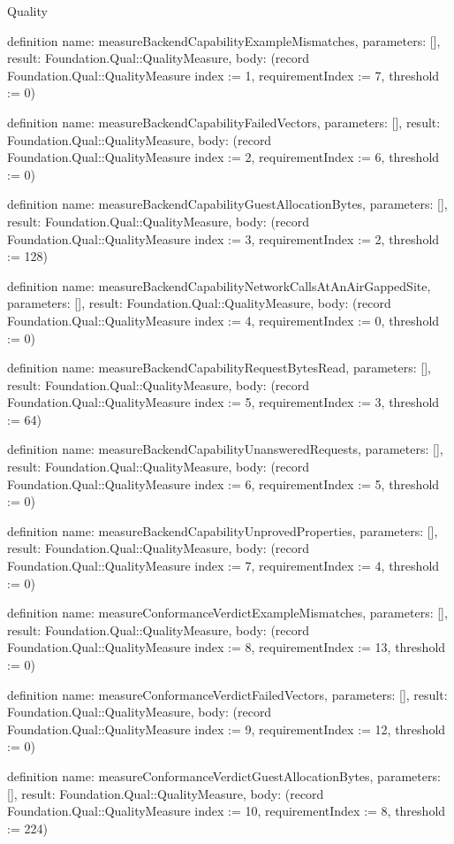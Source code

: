 \begin{lexlean}{Quality}
\begin{semanticmodule}
definition{
  name: measureBackendCapabilityExampleMismatches,
  parameters: [],
  result: Foundation.Qual::QualityMeasure,
  body: (record Foundation.Qual::QualityMeasure {index := 1, requirementIndex := 7, threshold := 0})
}

definition{
  name: measureBackendCapabilityFailedVectors,
  parameters: [],
  result: Foundation.Qual::QualityMeasure,
  body: (record Foundation.Qual::QualityMeasure {index := 2, requirementIndex := 6, threshold := 0})
}

definition{
  name: measureBackendCapabilityGuestAllocationBytes,
  parameters: [],
  result: Foundation.Qual::QualityMeasure,
  body: (record Foundation.Qual::QualityMeasure {index := 3, requirementIndex := 2, threshold := 128})
}

definition{
  name: measureBackendCapabilityNetworkCallsAtAnAirGappedSite,
  parameters: [],
  result: Foundation.Qual::QualityMeasure,
  body: (record Foundation.Qual::QualityMeasure {index := 4, requirementIndex := 0, threshold := 0})
}

definition{
  name: measureBackendCapabilityRequestBytesRead,
  parameters: [],
  result: Foundation.Qual::QualityMeasure,
  body: (record Foundation.Qual::QualityMeasure {index := 5, requirementIndex := 3, threshold := 64})
}

definition{
  name: measureBackendCapabilityUnansweredRequests,
  parameters: [],
  result: Foundation.Qual::QualityMeasure,
  body: (record Foundation.Qual::QualityMeasure {index := 6, requirementIndex := 5, threshold := 0})
}

definition{
  name: measureBackendCapabilityUnprovedProperties,
  parameters: [],
  result: Foundation.Qual::QualityMeasure,
  body: (record Foundation.Qual::QualityMeasure {index := 7, requirementIndex := 4, threshold := 0})
}

definition{
  name: measureConformanceVerdictExampleMismatches,
  parameters: [],
  result: Foundation.Qual::QualityMeasure,
  body: (record Foundation.Qual::QualityMeasure {index := 8, requirementIndex := 13, threshold := 0})
}

definition{
  name: measureConformanceVerdictFailedVectors,
  parameters: [],
  result: Foundation.Qual::QualityMeasure,
  body: (record Foundation.Qual::QualityMeasure {index := 9, requirementIndex := 12, threshold := 0})
}

definition{
  name: measureConformanceVerdictGuestAllocationBytes,
  parameters: [],
  result: Foundation.Qual::QualityMeasure,
  body: (record Foundation.Qual::QualityMeasure {index := 10, requirementIndex := 8, threshold := 224})
}


\end{semanticmodule}
\end{lexlean}
